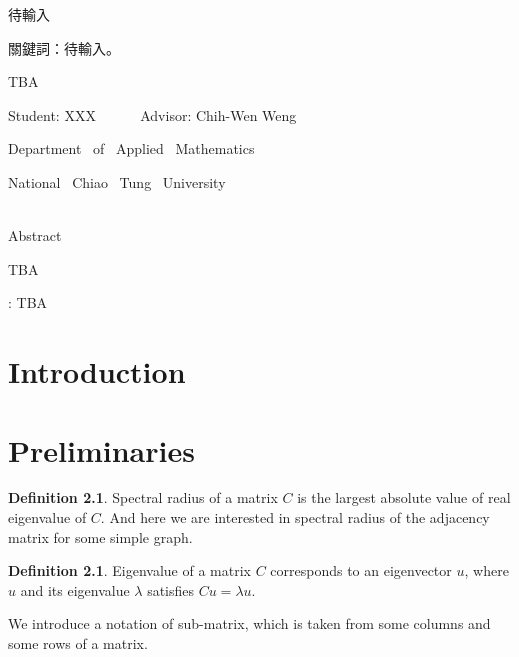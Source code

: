 \documentclass[12pt]{report}%
\renewcommand{\baselinestretch}{1.5} %
\theoremstyle{plain}
\theoremstyle{definition}
\newtheorem{defn}[thm]{Definition}
\begin{document}
待輸入\\
\bigskip

\noindent 關鍵詞：待輸入。
\pagebreak



\begin{center}{\LARGE
TBA
\bigskip\bigskip\bigskip}

{ \large
Student: XXX  ~~~~~ Advisor: Chih-Wen Weng \\
\Large

Department ~of~ Applied ~Mathematics
\bigskip

National~ Chiao ~Tung~ University
\bigskip\bigskip\bigskip\bigskip}\\
{\large Abstract}
\end{center}


TBA
\bigskip


: TBA
\pagebreak
\renewcommand{\baselinestretch}{1.2}
\large
\tableofcontents


\pagebreak

\chapter{Introduction}
\normalsize
{}






\chapter{Preliminaries}

\begin{defn}
Spectral radius of a matrix $C$ is the largest absolute value of real eigenvalue of $C$. And here we are interested in spectral radius of the adjacency matrix for some simple graph.
\end{defn}

\begin{defn}
    Eigenvalue of a matrix $C$ corresponds to an eigenvector $u$, where $u$ and its eigenvalue $\lambda $  satisfies $Cu = \lambda u$.
\end{defn}


    We introduce a notation of sub-matrix, which is taken from some columns and some rows of a matrix.
\end{document}
